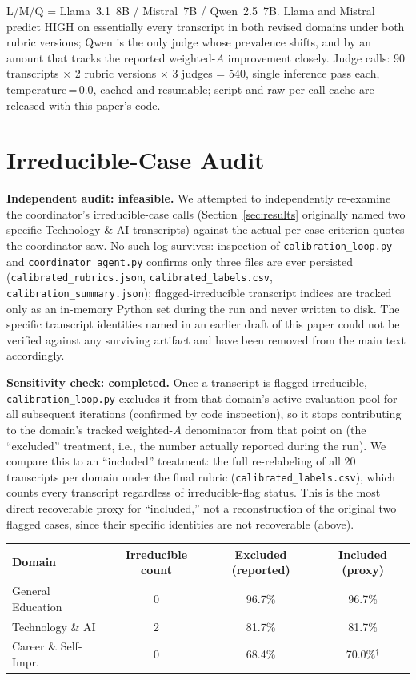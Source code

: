 \documentclass[11pt]{article}
\begin{document}
L/M/Q = Llama~3.1~8B / Mistral~7B / Qwen~2.5~7B. Llama and Mistral predict
HIGH on essentially every transcript in both revised domains under both
rubric versions; Qwen is the only judge whose prevalence shifts, and by an
amount that tracks the reported weighted-$A$ improvement closely. Judge
calls: 90 transcripts $\times$ 2 rubric versions $\times$ 3 judges = 540,
single inference pass each, temperature\,=\,0.0, cached and resumable;
script and raw per-call cache are released with this paper's code.

\section{Irreducible-Case Audit}
\label{app:irreducible}

\textbf{Independent audit: infeasible.} We attempted to independently
re-examine the coordinator's irreducible-case calls (Section~\ref{sec:results}
originally named two specific Technology \& AI transcripts) against the
actual per-case criterion quotes the coordinator saw. No such log survives:
inspection of \texttt{calibration\_loop.py} and \texttt{coordinator\_agent.py}
confirms only three files are ever persisted
(\texttt{calibrated\_rubrics.json}, \texttt{calibrated\_labels.csv},
\texttt{calibration\_summary.json}); flagged-irreducible transcript indices
are tracked only as an in-memory Python set during the run and never
written to disk. The specific transcript identities named in an earlier
draft of this paper could not be verified against any surviving artifact
and have been removed from the main text accordingly.

\textbf{Sensitivity check: completed.} Once a transcript is flagged
irreducible, \texttt{calibration\_loop.py} excludes it from that domain's
active evaluation pool for all subsequent iterations (confirmed by code
inspection), so it stops contributing to the domain's tracked weighted-$A$
denominator from that point on (the ``excluded'' treatment, i.e., the
number actually reported during the run). We compare this to an
``included'' treatment: the full re-relabeling of all 20 transcripts per
domain under the final rubric (\texttt{calibrated\_labels.csv}), which
counts every transcript regardless of irreducible-flag status. This is the
most direct recoverable proxy for ``included,'' not a reconstruction of
the original two flagged cases, since their specific identities are not
recoverable (above).

\begin{center}
\small
\begin{tabular}{lccc}
\toprule
\textbf{Domain} & \textbf{Irreducible count} & \textbf{Excluded (reported)} & \textbf{Included (proxy)} \\
\midrule
General Education         & 0 & 96.7\% & 96.7\% \\
Technology \& AI          & 2 & 81.7\% & 81.7\% \\
Career \& Self-Impr.\      & 0 & 68.4\% & 70.0\%$^\dagger$ \\
\bottomrule
\end{tabular}
\end{center}
\end{document}
